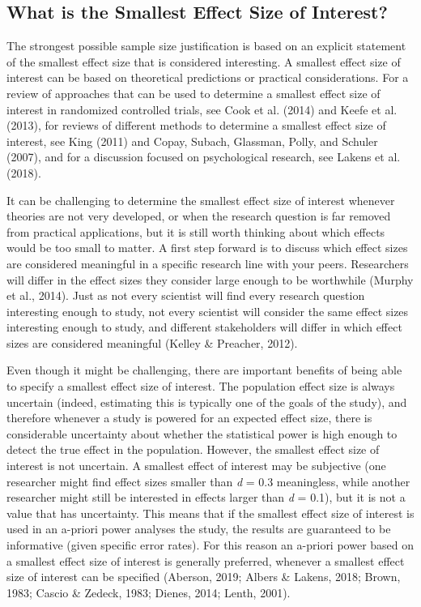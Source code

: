 \documentclass[
  english,
  ,jou, a4paper,floatsintext]{apa6}
\begin{document}
\hypertarget{what-is-the-smallest-effect-size-of-interest}{%
\subsection{What is the Smallest Effect Size of Interest?}\label{what-is-the-smallest-effect-size-of-interest}}

The strongest possible sample size justification is based on an explicit statement of the smallest effect size that is considered interesting. A smallest effect size of interest can be based on theoretical predictions or practical considerations. For a review of approaches that can be used to determine a smallest effect size of interest in randomized controlled trials, see Cook et al. (2014) and Keefe et al. (2013), for reviews of different methods to determine a smallest effect size of interest, see King (2011) and Copay, Subach, Glassman, Polly, and Schuler (2007), and for a discussion focused on psychological research, see Lakens et al. (2018).

It can be challenging to determine the smallest effect size of interest whenever theories are not very developed, or when the research question is far removed from practical applications, but it is still worth thinking about which effects would be too small to matter. A first step forward is to discuss which effect sizes are considered meaningful in a specific research line with your peers. Researchers will differ in the effect sizes they consider large enough to be worthwhile (Murphy et al., 2014). Just as not every scientist will find every research question interesting enough to study, not every scientist will consider the same effect sizes interesting enough to study, and different stakeholders will differ in which effect sizes are considered meaningful (Kelley \& Preacher, 2012).

Even though it might be challenging, there are important benefits of being able to specify a smallest effect size of interest. The population effect size is always uncertain (indeed, estimating this is typically one of the goals of the study), and therefore whenever a study is powered for an expected effect size, there is considerable uncertainty about whether the statistical power is high enough to detect the true effect in the population. However, the smallest effect size of interest is not uncertain. A smallest effect of interest may be subjective (one researcher might find effect sizes smaller than \emph{d} = 0.3 meaningless, while another researcher might still be interested in effects larger than \emph{d} = 0.1), but it is not a value that has uncertainty. This means that if the smallest effect size of interest is used in an a-priori power analyses the study, the results are guaranteed to be informative (given specific error rates). For this reason an a-priori power based on a smallest effect size of interest is generally preferred, whenever a smallest effect size of interest can be specified (Aberson, 2019; Albers \& Lakens, 2018; Brown, 1983; Cascio \& Zedeck, 1983; Dienes, 2014; Lenth, 2001).
\end{document}
